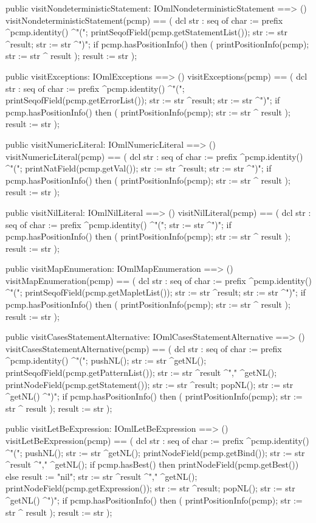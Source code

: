 \begin{vdm_al}
  public visitNondeterministicStatement: IOmlNondeterministicStatement ==> ()
  visitNondeterministicStatement(pcmp) ==
    ( dcl str : seq of char := prefix ^pcmp.identity() ^"(";
      printSeqofField(pcmp.getStatementList());
      str := str ^result;
      str := str ^")";
      if pcmp.hasPositionInfo()
      then ( printPositionInfo(pcmp);
             str := str ^ result );
      result := str );

  public visitExceptions: IOmlExceptions ==> ()
  visitExceptions(pcmp) ==
    ( dcl str : seq of char := prefix ^pcmp.identity() ^"(";
      printSeqofField(pcmp.getErrorList());
      str := str ^result;
      str := str ^")";
      if pcmp.hasPositionInfo()
      then ( printPositionInfo(pcmp);
             str := str ^ result );
      result := str );

  public visitNumericLiteral: IOmlNumericLiteral ==> ()
  visitNumericLiteral(pcmp) ==
    ( dcl str : seq of char := prefix ^pcmp.identity() ^"(";
      printNatField(pcmp.getVal());
      str := str ^result;
      str := str ^")";
      if pcmp.hasPositionInfo()
      then ( printPositionInfo(pcmp);
             str := str ^ result );
      result := str );

  public visitNilLiteral: IOmlNilLiteral ==> ()
  visitNilLiteral(pcmp) ==
    ( dcl str : seq of char := prefix ^pcmp.identity() ^"(";
      str := str ^")";
      if pcmp.hasPositionInfo()
      then ( printPositionInfo(pcmp);
             str := str ^ result );
      result := str );

  public visitMapEnumeration: IOmlMapEnumeration ==> ()
  visitMapEnumeration(pcmp) ==
    ( dcl str : seq of char := prefix ^pcmp.identity() ^"(";
      printSeqofField(pcmp.getMapletList());
      str := str ^result;
      str := str ^")";
      if pcmp.hasPositionInfo()
      then ( printPositionInfo(pcmp);
             str := str ^ result );
      result := str );

  public visitCasesStatementAlternative: IOmlCasesStatementAlternative ==> ()
  visitCasesStatementAlternative(pcmp) ==
    ( dcl str : seq of char := prefix ^pcmp.identity() ^"(";
      pushNL();
      str := str ^getNL();
      printSeqofField(pcmp.getPatternList());
      str := str ^result ^"," ^getNL();
      printNodeField(pcmp.getStatement());
      str := str ^result;
      popNL();
      str := str ^getNL() ^")";
      if pcmp.hasPositionInfo()
      then ( printPositionInfo(pcmp);
             str := str ^ result );
      result := str );

  public visitLetBeExpression: IOmlLetBeExpression ==> ()
  visitLetBeExpression(pcmp) ==
    ( dcl str : seq of char := prefix ^pcmp.identity() ^"(";
      pushNL();
      str := str ^getNL();
      printNodeField(pcmp.getBind());
      str := str ^result ^"," ^getNL();
      if pcmp.hasBest()
      then printNodeField(pcmp.getBest())
      else result := "nil";
      str := str ^result ^"," ^getNL();
      printNodeField(pcmp.getExpression());
      str := str ^result;
      popNL();
      str := str ^getNL() ^")";
      if pcmp.hasPositionInfo()
      then ( printPositionInfo(pcmp);
             str := str ^ result );
      result := str );


\end{vdm_al}
